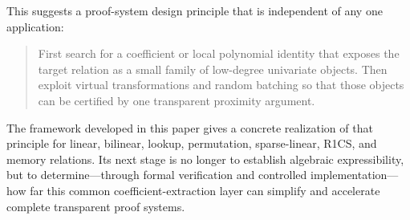 This suggests a proof-system design principle that is independent of any one application:
\begin{quote}
First search for a coefficient or local polynomial identity that exposes the target relation as a small family of low-degree univariate objects.  Then exploit virtual transformations and random batching so that those objects can be certified by one transparent proximity argument.
\end{quote}
The framework developed in this paper gives a concrete realization of that principle for linear, bilinear, lookup, permutation, sparse-linear, R1CS, and memory relations.  Its next stage is no longer to establish algebraic expressibility, but to determine---through formal verification and controlled implementation---how far this common coefficient-extraction layer can simplify and accelerate complete transparent proof systems.
